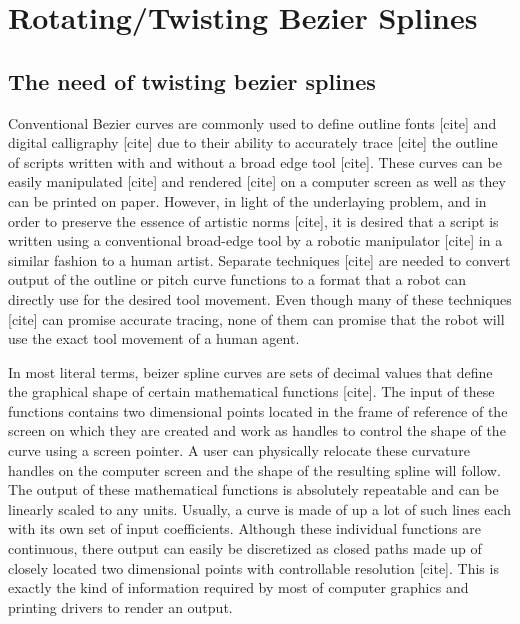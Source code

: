 \section{Rotating/Twisting Bezier Splines}
\label{Chapter:SplineModelling}

    \subsection{The need of twisting bezier splines}
    Conventional Bezier curves are commonly used to define outline fonts [cite] and digital calligraphy [cite] due to their ability to accurately trace [cite] the outline of scripts written with and without a broad edge tool [cite]. These curves can be easily manipulated [cite] and rendered [cite] on a computer screen as well as they can be printed on paper. However, in light of the underlaying problem, and in order to preserve the essence of artistic norms [cite], it is desired that a script is written using a conventional broad-edge tool by a robotic manipulator [cite] in a similar fashion to a human artist. Separate techniques [cite] are needed to convert output of the outline or pitch curve functions to a format that a robot can directly use for the desired tool movement. Even though many of these techniques [cite] can promise accurate tracing, none of them can promise that the robot will use the exact tool movement of a human agent.

    In most literal terms, beizer spline curves are sets of decimal values that define the graphical shape of certain mathematical functions [cite]. The input of these functions contains two dimensional points located in the frame of reference of the screen on which they are created and work as handles to control the shape of the curve using a screen pointer. A user can physically relocate these curvature handles on the computer screen and the shape of the resulting spline will follow. The output of these mathematical functions is absolutely repeatable and can be linearly scaled to any units. Usually, a curve is made of up a lot of such lines each with its own set of input coefficients. Although these individual functions are continuous, there output can easily be discretized as closed paths made up of closely located two dimensional points with controllable resolution [cite]. This is exactly the kind of information required by most of computer graphics and printing drivers to render an output.

